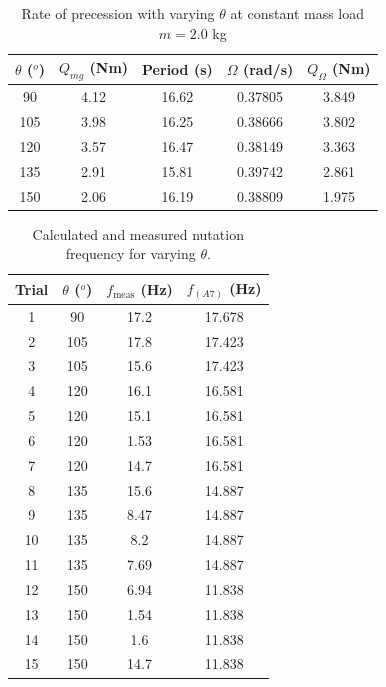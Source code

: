 \documentclass[8pt]{article}
\begin{document}
\begin{table}[H]
    \centering
    \begin{tabular}{|c|c|c|c|c|}
        \hline
        $\theta$ ($^o$) & $Q_{mg}$ (Nm) & Period (s) & $\Omega$ (rad/s) & $Q_{\Omega} $ (Nm) \\
        \hline
        90 & 4.12 & 16.62 & 0.37805 & 3.849\\
        105 & 3.98 & 16.25 & 0.38666 & 3.802\\
        120 & 3.57 & 16.47 & 0.38149 & 3.363\\
        135 & 2.91 & 15.81 & 0.39742 & 2.861\\
        150 & 2.06 & 16.19 & 0.38809 & 1.975\\
        \hline
    \end{tabular}
    \caption{Rate of precession with varying $\theta$ at constant mass load $m = 2.0$ kg}
    \label{tab:precession_vs_theta}
\end{table}


\begin{table}[H]
    \centering
    \begin{tabular}{|c|c|c|c|}
        \hline
        Trial & $\theta$ ($^o$) & $f_{\text{meas}}$ (Hz) & $f_{(A7)}$ (Hz) \\
        \hline
        1	& 90   &	17.2    & 	17.678 \\
        2	& 105  &	17.8    & 	17.423 \\
        3	& 105  &	15.6    & 	17.423 \\
        4	& 120  &	16.1    & 	16.581 \\
        5	& 120  &	15.1    & 	16.581 \\
        6	& 120  &	1.53    & 	16.581 \\
        7	& 120  &	14.7    & 	16.581 \\
        8	& 135  &	15.6    & 	14.887 \\
        9	& 135  &	8.47    & 	14.887 \\
        10	& 135  &	8.2	    &   14.887 \\
        11	& 135  &	7.69    & 	14.887 \\
        12	& 150  &	6.94    & 	11.838 \\
        13	& 150  &	1.54    & 	11.838 \\
        14	& 150  &	1.6	    &   11.838 \\
        15	& 150  &	14.7    & 	11.838 \\
        \hline
    \end{tabular}
    \caption{Calculated and measured nutation frequency for varying $\theta$.}
    \label{tab:nutation}
\end{table}
\end{document}
